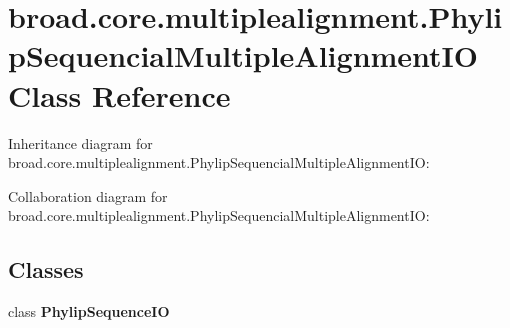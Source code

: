 \hypertarget{classbroad_1_1core_1_1multiplealignment_1_1_phylip_sequencial_multiple_alignment_i_o}{\section{broad.\+core.\+multiplealignment.\+Phylip\+Sequencial\+Multiple\+Alignment\+I\+O Class Reference}
\label{classbroad_1_1core_1_1multiplealignment_1_1_phylip_sequencial_multiple_alignment_i_o}
}


Inheritance diagram for broad.\+core.\+multiplealignment.\+Phylip\+Sequencial\+Multiple\+Alignment\+I\+O\+:


Collaboration diagram for broad.\+core.\+multiplealignment.\+Phylip\+Sequencial\+Multiple\+Alignment\+I\+O\+:
\subsection*{Classes}
\begin{DoxyCompactItemize}
\item 
class {\bfseries Phylip\+Sequence\+I\+O}
\end{DoxyCompactItemize}
